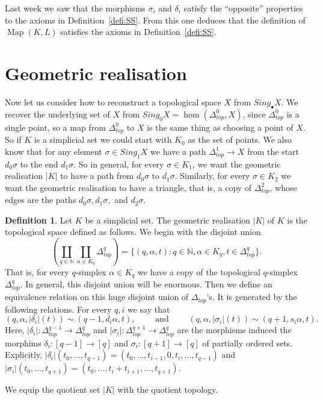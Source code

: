\documentclass[a4paper]{amsart}
\numberwithin{figure}{section}
\theoremstyle{theorem}
\theoremstyle{definition}
\newtheorem{defi}[thm]{Definition}
\newcommand{\NN}{\mathbb{N}}
\DeclareMathOperator{\Map}{Map}
\begin{document}
Last week we saw that the morphisms $\sigma_i$ and $\delta_i$ satisfy the ``opposite'' properties to the axioms in Definition~\ref{defi:SS}. From this one deduces that the definition of $\Map(K, L)$ satisfies the axioms in Definition~\ref{defi:SS}. 

\section{Geometric realisation}

Now let us consider how to reconstruct a topological space $X$ from $Sing_\bullet X$. We recover the underlying set of $X$ from $Sing_0 X = \hom(\Delta^0_{top}, X)$, since $\Delta^0_{top}$ is a single point, so a map from $\Delta^0_{top}$ to $X$ is the same thing as choosing a point of $X$. So if $K$ is a simplicial set we could start with $K_0$ as the set of points. We also know that for any element $\sigma \in Sing_1 X$ we have a path $\Delta^1_{top} \to X$ from the start $d_0 \sigma$ to the end $d_1 \sigma$. So in general, for every $\sigma \in K_1$, we want the geometric realisation $|K|$ to have a path from $d_0\sigma$ to $d_1\sigma$. Similarly, for every $\sigma \in K_2$ we want the geometric realisation to have a triangle, that is, a copy of $\Delta^2_{top}$, whose edges are the paths $d_0\sigma, d_1\sigma,$ and $d_2\sigma$. \\

\begin{mdframed}
\begin{defi}
Let $K$ be a simplicial set. The geometric realisation $|K|$ of $K$ is the topological space defined as follows. We begin with the disjoint union
\begin{equation} \label{equa:geomRealDisjointUnion}
\left ( \coprod_{q \in \NN} \coprod_{\alpha \in K_q} \Delta^q_{top} \right )= \{ (q, \alpha, t) : q \in \NN, \alpha \in K_q, t \in \Delta^q_{top} \}. 
 \end{equation}
That is, for every $q$-simplex $\alpha \in K_q$ we have a copy of the topological $q$-simplex $\Delta^q_{top}$. In general, this disjoint union will be enormous. Then we define an equivalence relation on this huge disjoint union of $\Delta_{top}$'s. It is generated by the following relations. For every $q, i$ we say that 
\begin{equation} \label{equa:equa:geomRealEquiv}
(q, \alpha, |\delta_i|(t)) \sim (q{-}1, d_i\alpha, t), \qquad  \textrm{ and } \qquad (q, \alpha, |\sigma_i|(t)) \sim (q{+}1, s_i\alpha, t). 
\end{equation}
Here, $|\delta_i|: \Delta^{q-1}_{top} \to \Delta^{q}_{top}$ and $|\sigma_i|: \Delta^{q+1}_{top} \to \Delta^q_{top}$ are the morphisms induced the morphims $\delta_i: [q-1] \to [q]$ and $\sigma_i: [q+1] \to [q]$ of partially ordered sets. Explicitly, $|\delta_i|(t_0, \dots, t_{q-1}) = (t_0, \dots, t_{i-1}, 0, t_i, \dots, t_{q-1})$ and $|\sigma_i|(t_0, \dots, t_{q+1}) = (t_0, \dots, t_i + t_{i+1}, \dots, t_{q+1})$.

We equip the quotient set $|K|$ with the quotient topology. 
\end{defi}
\end{mdframed}
\end{document}
